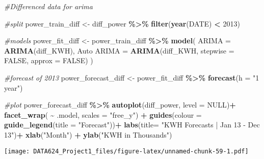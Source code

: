 \documentclass[
]{article}
\newenvironment{Shaded}{\begin{snugshade}}{\end{snugshade}}
\newcommand{\AttributeTok}[1]{\textcolor[rgb]{0.13,0.29,0.53}{#1}}
\newcommand{\CommentTok}[1]{\textcolor[rgb]{0.56,0.35,0.01}{\textit{#1}}}
\newcommand{\ConstantTok}[1]{\textcolor[rgb]{0.56,0.35,0.01}{#1}}
\newcommand{\DecValTok}[1]{\textcolor[rgb]{0.00,0.00,0.81}{#1}}
\newcommand{\FunctionTok}[1]{\textcolor[rgb]{0.13,0.29,0.53}{\textbf{#1}}}
\newcommand{\NormalTok}[1]{#1}
\newcommand{\OtherTok}[1]{\textcolor[rgb]{0.56,0.35,0.01}{#1}}
\newcommand{\SpecialCharTok}[1]{\textcolor[rgb]{0.81,0.36,0.00}{\textbf{#1}}}
\newcommand{\StringTok}[1]{\textcolor[rgb]{0.31,0.60,0.02}{#1}}
\begin{document}
\begin{Shaded}
\begin{Highlighting}[]
\CommentTok{\#Differenced data for arima}

\CommentTok{\#split}
\NormalTok{power\_train\_diff }\OtherTok{\textless{}{-}}\NormalTok{ diff\_power }\SpecialCharTok{\%\textgreater{}\%} 
  \FunctionTok{filter}\NormalTok{(}\FunctionTok{year}\NormalTok{(DATE) }\SpecialCharTok{\textless{}} \DecValTok{2013}\NormalTok{)}

\CommentTok{\#models}
\NormalTok{power\_fit\_diff }\OtherTok{\textless{}{-}}\NormalTok{ power\_train\_diff }\SpecialCharTok{\%\textgreater{}\%} 
    \FunctionTok{model}\NormalTok{(}
    \AttributeTok{ARIMA =} \FunctionTok{ARIMA}\NormalTok{(diff\_KWH),}
    \StringTok{\textasciigrave{}}\AttributeTok{Auto ARIMA}\StringTok{\textasciigrave{}} \OtherTok{=} \FunctionTok{ARIMA}\NormalTok{(diff\_KWH, }\AttributeTok{stepwise =} \ConstantTok{FALSE}\NormalTok{, }\AttributeTok{approx =} \ConstantTok{FALSE}\NormalTok{)}
\NormalTok{  )}

\CommentTok{\#forecast of 2013}
\NormalTok{power\_forecast\_diff }\OtherTok{\textless{}{-}}\NormalTok{ power\_fit\_diff }\SpecialCharTok{\%\textgreater{}\%} 
  \FunctionTok{forecast}\NormalTok{(}\AttributeTok{h =} \StringTok{"1 year"}\NormalTok{)}

\CommentTok{\#plot}
\NormalTok{power\_forecast\_diff }\SpecialCharTok{\%\textgreater{}\%}
  \FunctionTok{autoplot}\NormalTok{(diff\_power, }\AttributeTok{level =} \ConstantTok{NULL}\NormalTok{)}\SpecialCharTok{+}
  \FunctionTok{facet\_wrap}\NormalTok{( }\SpecialCharTok{\textasciitilde{}}\NormalTok{ .model, }\AttributeTok{scales =} \StringTok{"free\_y"}\NormalTok{) }\SpecialCharTok{+}
  \FunctionTok{guides}\NormalTok{(}\AttributeTok{colour =} \FunctionTok{guide\_legend}\NormalTok{(}\AttributeTok{title =} \StringTok{"Forecast"}\NormalTok{))}\SpecialCharTok{+}
  \FunctionTok{labs}\NormalTok{(}\AttributeTok{title=} \StringTok{"KWH Forecasts | Jan \textquotesingle{}13 {-} Dec \textquotesingle{}13"}\NormalTok{)}\SpecialCharTok{+}
  \FunctionTok{xlab}\NormalTok{(}\StringTok{"Month"}\NormalTok{) }\SpecialCharTok{+}
  \FunctionTok{ylab}\NormalTok{(}\StringTok{"KWH in Thousands"}\NormalTok{) }
\end{Highlighting}
\end{Shaded}

\texttt{[image: DATA624\_Project1\_files/figure-latex/unnamed-chunk-59-1.pdf]}
\end{document}
